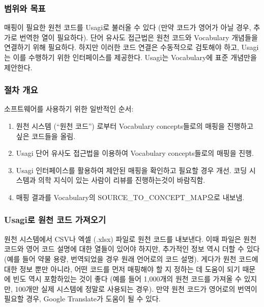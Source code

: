 \documentclass[11pt]{book}
\providecommand{\tightlist}{%
  \setlength{\itemsep}{0pt}\setlength{\parskip}{0pt}}
\theoremstyle{definition}
\theoremstyle{definition}
\theoremstyle{definition}
\theoremstyle{remark}
\begin{document}
\subsubsection*{범위와 목표}\label{--2}

매핑이 필요한 원천 코드를 Usagi로 불러올 수 있다 (만약 코드가 영어가
아닐 경우, 추가로 번역한 열이 필요하다). 단어 유사도 접근법은 원천
코드와 Vocabulary 개념들을 연결하기 위해 필요하다. 하지만 이러한 코드
연결은 수동적으로 검토해야 하고, Usagi는 이를 수행하기 위한 인터페이스를
제공한다. Usagi는 Vocabulary에 표준 개념만을 제안한다.

\subsubsection*{절차 개요}\label{--2}

소프트웨어를 사용하기 위한 일반적인 순서:

\begin{enumerate}
\def\labelenumi{\arabic{enumi}.}
\tightlist
\item
  원천 시스템 (``원천 코드'') 로부터 Vocabulary concepts들로의 매핑을
  진행하고 싶은 코드들을 올림.
\item
  Usagi 단어 유사도 접근법을 이용하여 Vocabulary concepts들로의 매핑을
  진행.
\item
  Usagi 인터페이스를 활용하여 제안된 매핑을 확인하고 필요할 경우 개선.
  코딩 시스템과 의학 지식이 있는 사람이 리뷰를 진행하는것이 바람직함.
\item
  매핑 결과를 Vocabulary의 SOURCE\_TO\_CONCEPT\_MAP으로 내보냄.
\end{enumerate}

\subsubsection{Usagi로 원천 코드 가져오기}\label{usagi---}

원천 시스템에서 CSV나 엑셀 (.xlsx) 파일로 원천 코드를 내보낸다. 이때
파일은 원천 코드와 영어 코드 설명에 대한 열들이 있어야 하지만, 추가적인
정보 역시 더할 수 있다 (예를 들어 약물 용량, 번역되었을 경우 원래
언어로의 코드 설명). 게다가 원천 코드에 대한 정보 뿐만 아니라, 어떤
코드를 먼저 매핑해야 할 지 정하는 데 도움이 되기 때문에 빈도 역시
포함하있는 것이 좋다 (예를 들어 1,000개의 원천 코드를 가져올 수 있지만,
100개만 실제 시스템에 정말로 사용되는 경우). 만약 원천 코드가 영어로의
번역이 필요할 경우, Google Translate가 도움이 될 수 있다.
\end{document}
